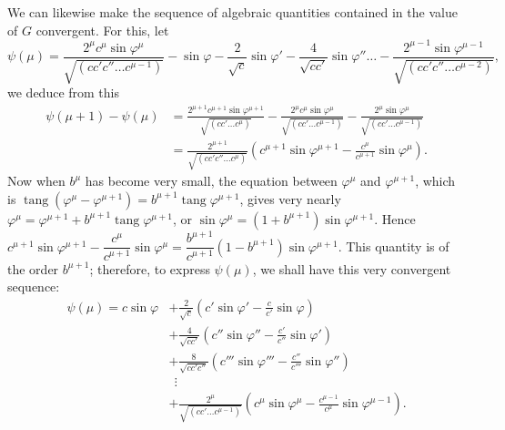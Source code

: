 \documentclass{article}
\begin{document}
We can likewise make the sequence of algebraic quantities contained in the value of $G$ convergent. For this, let
\[ \psi(\mu)=\frac{2^{\mu}c^{\mu}\sin\varphi^{\mu}}{\sqrt{(cc'c''\ldots c^{\mu-1})}}-\sin\varphi-\frac{2}{\sqrt{c}}\sin\varphi'-\frac{4}{\sqrt{cc'}}\sin\varphi''\ldots-\frac{2^{\mu-1}\sin\varphi^{\mu-1}}{\sqrt{(cc'c''\ldots c^{\mu-2})}}, \]
we deduce from this
\[ \begin{aligned} \psi(\mu+1)-\psi(\mu)&=\frac{2^{\mu+1}c^{\mu+1}\sin\varphi^{\mu+1}}{\sqrt{(cc'\ldots c^{\mu})}}-\frac{2^{\mu}c^{\mu}\sin\varphi^{\mu}}{\sqrt{(cc'\ldots c^{\mu-1})}}-\frac{2^{\mu}\sin\varphi^{\mu}}{\sqrt{(cc'\ldots c^{\mu-1})}}\\ &=\frac{2^{\mu+1}}{\sqrt{(cc'c''\ldots c^{\mu})}}\left(c^{\mu+1}\sin\varphi^{\mu+1}-\frac{c^{\mu}}{c^{\mu+1}}\sin\varphi^{\mu}\right). \end{aligned} \]
Now when $b^{\mu}$ has become very small, the equation between $\varphi^{\mu}$ and $\varphi^{\mu+1}$, which is $\operatorname{tang}(\varphi^{\mu}-\varphi^{\mu+1})=b^{\mu+1}\operatorname{tang}\varphi^{\mu+1}$, gives very nearly $\varphi^{\mu}=\varphi^{\mu+1}+b^{\mu+1}\operatorname{tang}\varphi^{\mu+1}$, or $\sin\varphi^{\mu}=(1+b^{\mu+1})\sin\varphi^{\mu+1}$. Hence $c^{\mu+1}\sin\varphi^{\mu+1}-\dfrac{c^{\mu}}{c^{\mu+1}}\sin\varphi^{\mu}=\dfrac{b^{\mu+1}}{c^{\mu+1}}(1-b^{\mu+1})\sin\varphi^{\mu+1}$. This quantity is of the order $b^{\mu+1}$; therefore, to express $\psi(\mu)$, we shall have this very convergent sequence:
\[ \begin{aligned} \psi(\mu)=c\sin\varphi&+\frac{2}{\sqrt{c}}\left(c'\sin\varphi'-\frac{c}{c'}\sin\varphi\right)\\ &+\frac{4}{\sqrt{cc'}}\left(c''\sin\varphi''-\frac{c'}{c''}\sin\varphi'\right)\\ &+\frac{8}{\sqrt{cc'c''}}\left(c'''\sin\varphi'''-\frac{c''}{c'''}\sin\varphi''\right)\\ &\ \ \vdots\\ &+\frac{2^{\mu}}{\sqrt{(cc'\ldots c^{\mu-1})}}\left(c^{\mu}\sin\varphi^{\mu}-\frac{c^{\mu-1}}{c^{\mu}}\sin\varphi^{\mu-1}\right). \end{aligned} \]
\end{document}

